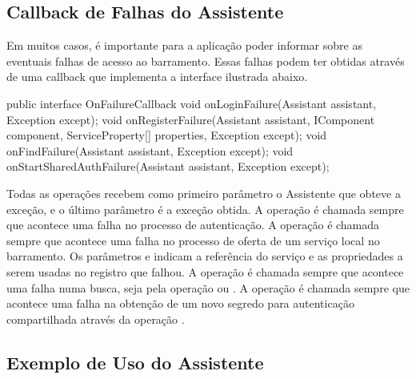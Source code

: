 \subsection{Callback de Falhas do Assistente} \label{sec:AssisantFailureCallback}

Em muitos casos, é importante para a aplicação poder informar sobre as eventuais falhas de acesso ao barramento.
Essas falhas podem ter obtidas através de uma callback que implementa a interface  ilustrada abaixo.

\begin{samplecode}
public interface OnFailureCallback {
  void onLoginFailure(Assistant assistant,
                      Exception except);
  void onRegisterFailure(Assistant assistant,
                         IComponent component,
                         ServiceProperty[] properties,
                         Exception except);
  void onFindFailure(Assistant assistant,
                     Exception except);
  void onStartSharedAuthFailure(Assistant assistant,
                                Exception except);
}
\end{samplecode}

Todas as operações recebem como primeiro parâmetro o Assistente que obteve a exceção, e o último parâmetro é a exceção obtida.
A operação  é chamada sempre que acontece uma falha no processo de autenticação.
A operação  é chamada sempre que acontece uma falha no processo de oferta de um serviço local no barramento.
Os parâmetros  e  indicam a referência do serviço e as propriedades a serem usadas no registro que falhou.
A operação  é chamada sempre que acontece uma falha numa busca, seja pela operação  ou .
A operação  é chamada sempre que acontece uma falha na obtenção de um novo segredo para autenticação compartilhada através da operação .

\subsection{Exemplo de Uso do Assistente}

